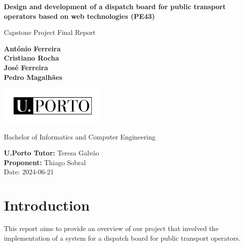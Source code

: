 \documentclass[10pt]{article}
\begin{document}
\begin{titlepage}
    \begin{center}
        \vspace*{1cm}

    {\fontsize{17}{16}\selectfont \textbf{Design and development of a dispatch board for public transport operators based on web technologies (PE43)}}

        \vspace{0.5cm}
        Capstone Project Final Report

        \vspace{1.5cm}

        \textbf{António Ferreira} \\
        \textbf{Cristiano Rocha} \\
        \textbf{José Ferreira} \\
        \textbf{Pedro Magalhães} \\

                \vfill

        \includegraphics[width=0.4\textwidth]{UPORTO_fundotransparente}


        Bachelor of Informatics and Computer Engineering

        \vspace{0.8cm}

        \textbf{U.Porto Tutor:} Teresa Galvão \\
        \textbf{Proponent:} Thiago Sobral \\

    \vspace{0.4cm}
        Date: 2024-06-21

    \end{center}
\end{titlepage}

\thispagestyle{empty}
\clearpage

\thispagestyle{empty}
\tableofcontents

\clearpage

\section{Introduction}
    This report aims to provide an overview of our project that involved the implementation of a system for a dispatch board for public transport operators.
\end{document}
